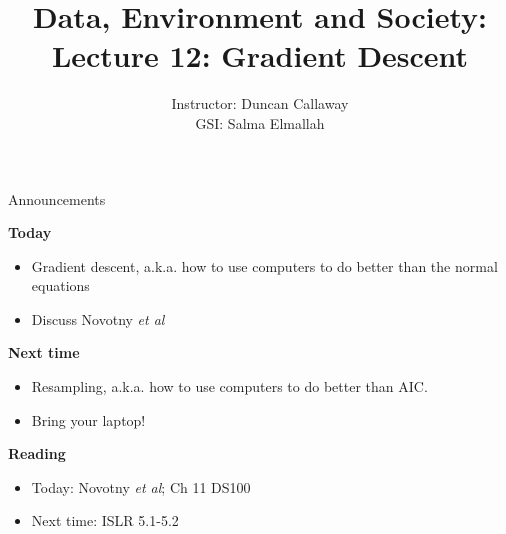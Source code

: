 \documentclass[aspectratio=169, handout]{beamer}
\title[Lecture 12: Gradient Descent] %
{Data, Environment and Society: \\{Lecture 12: Gradient Descent}}
\author[ER131: Data, Environment and Society] 
{Instructor: Duncan Callaway\\
GSI: Salma Elmallah}
\institute[UC Berkeley] %
 {\small{ \bf October 8, 2019}}
\date[October 8, 2019]
\begin{document}
\begin{frame}
  \titlepage
\end{frame}

\begin{frame}{Announcements}

\textbf{Today}
\begin{itemize}
\item Gradient descent, a.k.a. how to use computers to do better than the normal equations
\item Discuss Novotny \textit{et al}
\end{itemize}

\textbf{Next time}
\begin{itemize}
\item Resampling, a.k.a. how to use computers to do better than AIC.
\item Bring your laptop!
\end{itemize}

\textbf{Reading}
\begin{itemize}
\item Today: Novotny \textit{et al}; Ch 11 DS100
\item Next time: ISLR 5.1-5.2
\end{itemize}
\end{frame}
\end{document}
